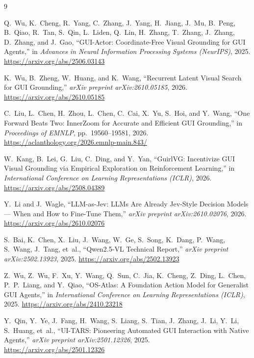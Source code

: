 \documentclass[10pt,twocolumn,letterpaper]{article}
\begin{document}
\begin{thebibliography}{9}
\footnotesize
\setlength{\itemsep}{0pt}\setlength{\parskip}{0pt}

Q.~Wu, K.~Cheng, R.~Yang, C.~Zhang, J.~Yang, H.~Jiang, J.~Mu, B.~Peng, B.~Qiao, R.~Tan, S.~Qin, L.~Liden, Q.~Lin, H.~Zhang, T.~Zhang, J.~Zhang, D.~Zhang, and J.~Gao, ``GUI-Actor: Coordinate-Free Visual Grounding for GUI Agents,'' in \emph{Advances in Neural Information Processing Systems (NeurIPS)}, 2025. \url{https://arxiv.org/abs/2506.03143}

K.~Wu, B.~Zheng, W.~Huang, and K.~Wang, ``Recurrent Latent Visual Search for GUI Grounding,'' \emph{arXiv preprint arXiv:2610.05185}, 2026. \url{https://arxiv.org/abs/2610.05185}

C.~Liu, L.~Chen, H.~Zhou, L.~Chen, C.~Cai, X.~Yu, S.~Hoi, and Y.~Wang, ``One Forward Beats Two: InnerZoom for Accurate and Efficient GUI Grounding,'' in \emph{Proceedings of EMNLP}, pp.~19560--19581, 2026. \url{https://aclanthology.org/2026.emnlp-main.843/}

W.~Kang, B.~Lei, G.~Liu, C.~Ding, and Y.~Yan, ``GuirlVG: Incentivize GUI Visual Grounding via Empirical Exploration on Reinforcement Learning,'' in \emph{International Conference on Learning Representations (ICLR)}, 2026. \url{https://arxiv.org/abs/2508.04389}

Y.~Li and J.~Wagle, ``LLM-as-Jev: LLMs Are Already Jev-Style Decision Models --- When and How to Fine-Tune Them,'' \emph{arXiv preprint arXiv:2610.02076}, 2026. \url{https://arxiv.org/abs/2610.02076}

S.~Bai, K.~Chen, X.~Liu, J.~Wang, W.~Ge, S.~Song, K.~Dang, P.~Wang, S.~Wang, J.~Tang, et~al., ``Qwen2.5-VL Technical Report,'' \emph{arXiv preprint arXiv:2502.13923}, 2025. \url{https://arxiv.org/abs/2502.13923}

Z.~Wu, Z.~Wu, F.~Xu, Y.~Wang, Q.~Sun, C.~Jia, K.~Cheng, Z.~Ding, L.~Chen, P.~P.~Liang, and Y.~Qiao, ``OS-Atlas: A Foundation Action Model for Generalist GUI Agents,'' in \emph{International Conference on Learning Representations (ICLR)}, 2025. \url{https://arxiv.org/abs/2410.23218}

Y.~Qin, Y.~Ye, J.~Fang, H.~Wang, S.~Liang, S.~Tian, J.~Zhang, J.~Li, Y.~Li, S.~Huang, et~al., ``UI-TARS: Pioneering Automated GUI Interaction with Native Agents,'' \emph{arXiv preprint arXiv:2501.12326}, 2025. \url{https://arxiv.org/abs/2501.12326}

\end{thebibliography}
\end{document}
